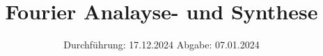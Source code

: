 

\subject{V351}
\title{Fourier Analayse- und Synthese}
\date{%
  Durchführung: 17.12.2024
  \hspace{3em}
  Abgabe: 07.01.2024
}



\maketitle
\thispagestyle{empty}
\tableofcontents
\newpage






\printbibliography{}


